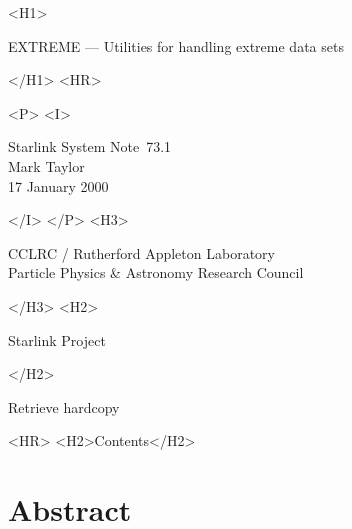 \documentclass[twoside,11pt]{article}
\newcommand{\stardoccategory}  {Starlink System Note}
\newcommand{\stardocsource}    {ssn\stardocnumber}
\newcommand{\stardocnumber}    {73.1}
\newcommand{\stardocauthors}   {Mark Taylor}
\newcommand{\stardocdate}      {17 January 2000}
\newcommand{\stardoctitle}     {EXTREME --- 
                                Utilities for handling extreme data sets}
\newcommand{\htmladdnormallink}[2]{#1}
\newcommand{\htmladdimg}[1]{}
\newcommand{\htmlref}[2]{#1}
\newcommand{\htmladdtonavigation}[1]{}
\newcommand{\xlabel}[1]{}
\renewcommand{\_}{\texttt{\symbol{95}}}
\begin{document}
\begin{htmlonly}
   \xlabel{}
   \begin{rawhtml} <H1> \end{rawhtml}
      \stardoctitle
   \begin{rawhtml} </H1> <HR> \end{rawhtml}

   \begin{rawhtml} <P> <I> \end{rawhtml}
   \stardoccategory\ \stardocnumber \\
   \stardocauthors \\
   \stardocdate
   \begin{rawhtml} </I> </P> <H3> \end{rawhtml}
      \htmladdnormallink{CCLRC / Rutherford Appleton Laboratory}
                        {http://www.cclrc.ac.uk} \\
      \htmladdnormallink{Particle Physics \& Astronomy Research Council}
                        {http://www.pparc.ac.uk} \\
   \begin{rawhtml} </H3> <H2> \end{rawhtml}
      \htmladdnormallink{Starlink Project}{http://www.starlink.rl.ac.uk/}
   \begin{rawhtml} </H2> \end{rawhtml}
   \htmladdnormallink{\htmladdimg{source.gif} Retrieve hardcopy}
      {http://www.starlink.rl.ac.uk/cgi-bin/hcserver?\stardocsource}\\

  \label{stardoccontents}
  \begin{rawhtml} 
    <HR>
    <H2>Contents</H2>
  \end{rawhtml}
  \htmladdtonavigation{\htmlref{\htmladdimg{contents_motif.gif}}
        {stardoccontents}}

  \section{\xlabel{abstract}Abstract}

\end{htmlonly}
\end{document}

